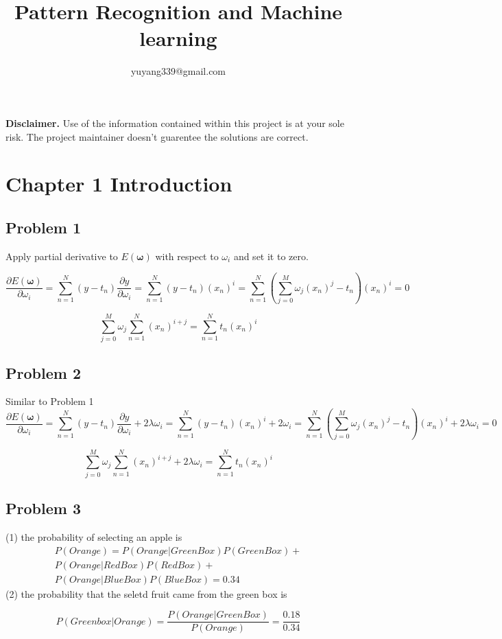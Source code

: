\documentclass{article}
\author{yuyang339@gmail.com}
\title{Pattern Recognition and Machine learning}
\date{}
\begin{document}
\maketitle

\textbf{Disclaimer.} Use of the information contained within this project is at your sole risk. The project maintainer doesn't guarentee the solutions are correct.

\section*{Chapter 1 Introduction}
\subsection*{Problem 1}
\begin{flushleft}
Apply partial derivative to $E(\boldsymbol{\omega})$ with respect to $\omega_{i}$ and set it to zero.

\begin{equation}
\frac{\partial E(\boldsymbol{\omega})}{\partial \omega_{i}} = \sum_{n=1}^{N}{(y-t_{n})}\frac{\partial y}{\partial \omega_{i}} = \sum_{n=1}^{N}{(y-t_{n})}(x_{n})^i =\sum_{n=1}^{N}{(\sum_{j=0}^{M}\omega_{j}(x_{n})^{j}-t_{n})}(x_{n})^i = 0
\end{equation}

\begin{equation}
\sum_{j=0}^{M}\omega_{j}\sum_{n=1}^{N}{(x_{n})^{i+j}= \sum_{n=1}^{N}t_{n}}(x_{n})^i 
\end{equation}


\subsection*{Problem 2}
Similar to Problem 1
\begin{equation}
\frac{\partial E(\boldsymbol{\omega})}{\partial \omega_{i}} = \sum_{n=1}^{N}{(y-t_{n})}\frac{\partial y}{\partial \omega_{i}} + 2\lambda\omega_{i} = \sum_{n=1}^{N}{(y-t_{n})}(x_{n})^i + 2\omega_{i} =\sum_{n=1}^{N}{(\sum_{j=0}^{M}\omega_{j}(x_{n})^{j}-t_{n})}(x_{n})^i + 2\lambda\omega_{i}= 0
\end{equation}

\begin{equation}
\sum_{j=0}^{M}\omega_{j}\sum_{n=1}^{N}{(x_{n})^{i+j} + 2\lambda\omega_{i}= \sum_{n=1}^{N}t_{n}}(x_{n})^i 
\end{equation}

\subsection*{Problem 3}
(1) the probability of selecting an apple is
\begin{equation}
\begin{split}
P(Orange) = P(Orange|Green Box)P(Green Box) + \\
 P(Orange|Red Box)P(Red Box)+ \\
 P(Orange|Blue Box)P(Blue Box) = 0.34
 \end{split}
\end{equation}
(2) the probability that the seletd fruit came from the green box is 

\begin{equation}
P(Green box|Orange) = \frac{P(Orange|Green Box)}{P(Orange)} = \frac{0.18}{0.34}
\end{equation}
\end{flushleft}
\end{document}
